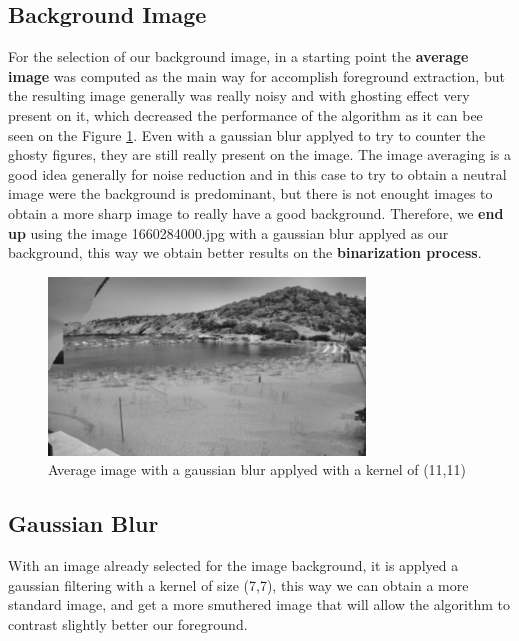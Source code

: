 \documentclass[10pt]{article}
\begin{document}
\subsection*{Background Image}

For the selection of our background image, in a starting point the \textbf{average image} was computed as the main way for accomplish foreground extraction, but the resulting image generally was really noisy and with ghosting effect very present on it, which decreased the performance of the algorithm as it can bee seen on the Figure \ref{fig:avg}. Even with a gaussian blur applyed to try to counter the ghosty figures, they are still really present on the image. The image averaging is a good idea generally for noise reduction and in this case to try to obtain a neutral image were the background is predominant, but there is not enought images to obtain a more sharp image to really have a good background. Therefore, we \textbf{end up} using the image 1660284000.jpg with a gaussian blur applyed as our background, this way we obtain better results on the \textbf{binarization process}.

\begin{figure}[h]
    \centering
    \includegraphics[width=0.75\textwidth]{img/avg.png}
    \caption{Average image with a gaussian blur applyed with a kernel of (11,11)}
    \label{fig:avg}
\end{figure}


\subsection*{Gaussian Blur}
With an image already selected for the image background, it is applyed a gaussian filtering with a kernel of size (7,7), this way  we can obtain a more standard image, and get a more smuthered image that will allow the algorithm to contrast slightly better our foreground.\newline
\end{document}
